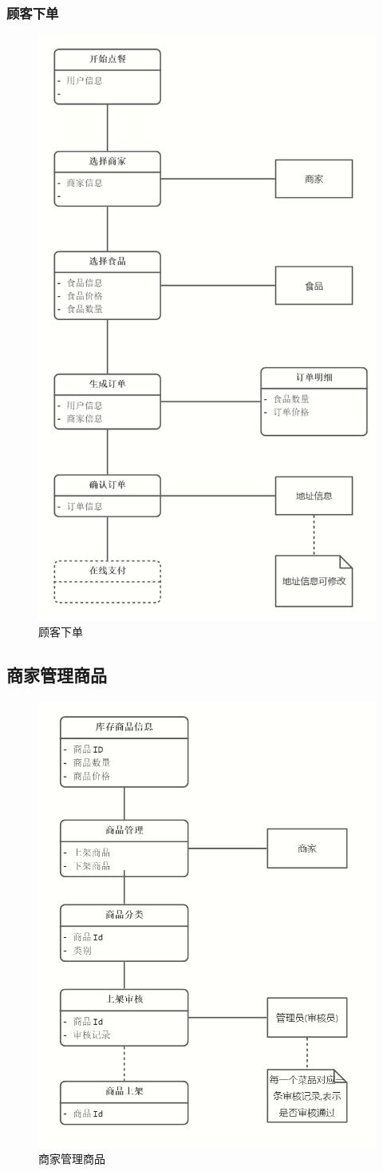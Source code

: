\subsubsection{顾客下单}
\begin{figure}[H]
    \centering
    \includegraphics[width=0.7\linewidth]{pics/3.png}
    \caption{顾客下单}
    \label{fig:gkxd}
\end{figure}

\subsection{商家管理商品}

\begin{figure}[H]
    \centering
    \includegraphics[width=0.4\linewidth]{pics/4.png}
    \caption{商家管理商品}
    \label{fig:sjglsp}
\end{figure}

